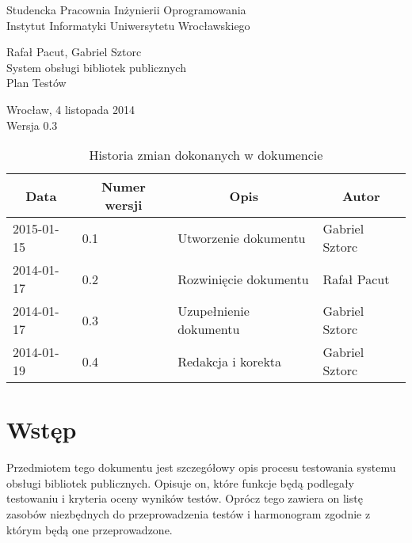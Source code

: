 \documentclass[11pt,a4paper]{article}
\begin{document}
%
%
\begin{center}
	\Large
	Studencka Pracownia Inżynierii Oprogramowania \\[0.5cm]
	Instytut Informatyki Uniwersytetu Wrocławskiego 

	\vspace*{\fill}
	Rafał Pacut, Gabriel Sztorc \\[1cm]
	{\Huge System obsługi bibliotek publicznych} \\[1cm]
	Plan Testów
	\vspace*{\fill}

	Wrocław, 4 listopada 2014 \\[0.5cm]
	Wersja 0.3
\end{center}
\newpage
{}
\setcounter{page}{2}
%
%

%
%
\begin{table}
\caption{Historia zmian dokonanych w dokumencie}
\begin{tabular}{|l|l|l|l|}
    \hline
    \multicolumn{1}{|c|}{Data} & \multicolumn{1}{c|}{Numer wersji} & 
        \multicolumn{1}{c|}{Opis} & \multicolumn{1}{c|}{Autor} \\
    \hline \hline
    2015-01-15 & 0.1 & Utworzenie dokumentu & Gabriel Sztorc \\
    \hline
    2014-01-17 & 0.2 & Rozwinięcie dokumentu & Rafał Pacut \\
    \hline
    2014-01-17 & 0.3 & Uzupełnienie dokumentu & Gabriel Sztorc \\
    \hline
    2014-01-19 & 0.4 & Redakcja i korekta & Gabriel Sztorc \\
    \hline
\end{tabular}
\end{table}
%
%

\tableofcontents

\newpage

\section{Wstęp}
Przedmiotem tego dokumentu jest szczegółowy opis procesu testowania systemu obsługi bibliotek publicznych.
Opisuje on, które funkcje będą podlegały testowaniu i kryteria oceny wyników testów.
Oprócz tego zawiera on listę zasobów niezbędnych do przeprowadzenia testów i harmonogram
zgodnie z którym będą one przeprowadzone.
\end{document}
